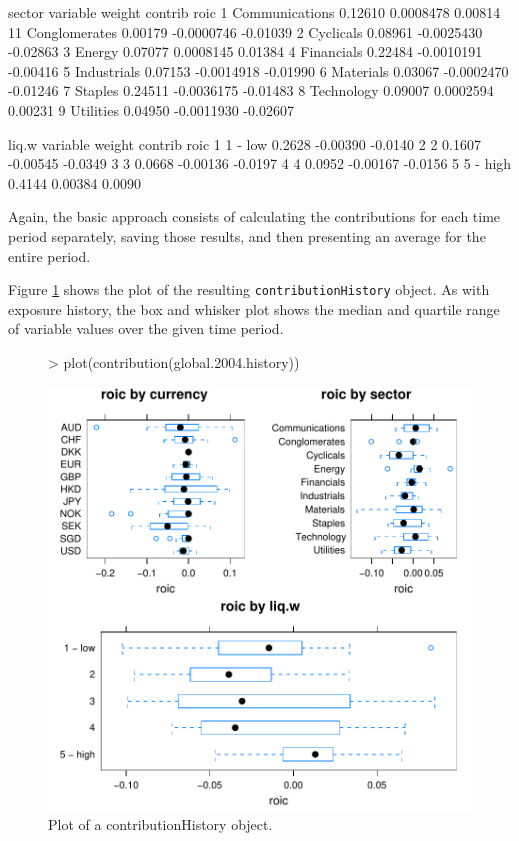 \documentclass[a4paper]{report}
\begin{document}
\begin{article}
\begin{Schunk}
\begin{Soutput}
sector 
         variable  weight    contrib     roic
1  Communications 0.12610  0.0008478  0.00814
11  Conglomerates 0.00179 -0.0000746 -0.01039
2       Cyclicals 0.08961 -0.0025430 -0.02863
3          Energy 0.07077  0.0008145  0.01384
4      Financials 0.22484 -0.0010191 -0.00416
5     Industrials 0.07153 -0.0014918 -0.01990
6       Materials 0.03067 -0.0002470 -0.01246
7         Staples 0.24511 -0.0036175 -0.01483
8      Technology 0.09007  0.0002594  0.00231
9       Utilities 0.04950 -0.0011930 -0.02607

liq.w 
  variable weight  contrib    roic
1  1 - low 0.2628 -0.00390 -0.0140
2        2 0.1607 -0.00545 -0.0349
3        3 0.0668 -0.00136 -0.0197
4        4 0.0952 -0.00167 -0.0156
5 5 - high 0.4144  0.00384  0.0090
\end{Soutput}
\end{Schunk}

Again, the basic approach consists of calculating the contributions
for each time period separately, saving those results, and then
presenting an average for the entire period. 

Figure \ref{figure:plot.contributionHistory} shows the plot of the
resulting \texttt{contributionHistory} object.  As with exposure
history, the box and whisker plot shows the median and quartile range
of variable values over the given time period.

\begin{figure}
\centering
\vspace*{.1in}
\begin{Schunk}
\begin{Sinput}
> plot(contribution(global.2004.history))
\end{Sinput}
\end{Schunk}
\includegraphics{portfolio-021}
\caption{\label{figure:plot.contributionHistory} Plot of a contributionHistory object.}
\end{figure}



\end{article}
\end{document}
